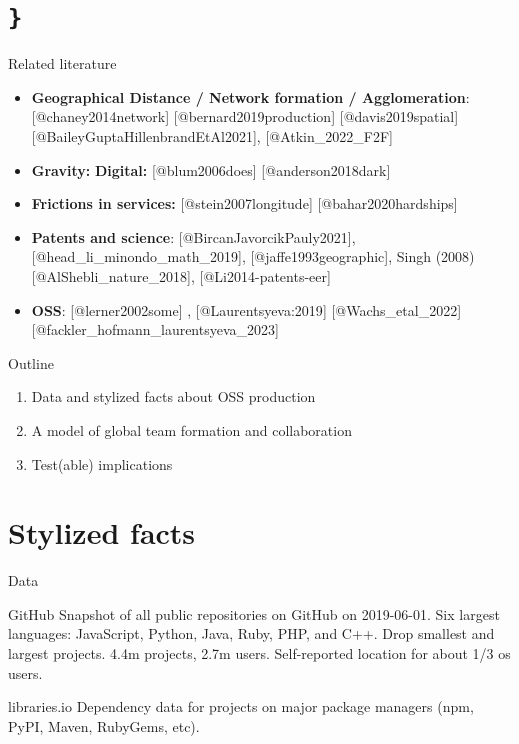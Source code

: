\documentclass[
  ignorenonframetext,
  aspectratio=169,
]{beamer}
\providecommand{\tightlist}{%
  \setlength{\itemsep}{0pt}\setlength{\parskip}{0pt}}
\begin{document}
\section{\texorpdfstring{\texttt{\}}}{\}}}\label{section}

\begin{frame}{Related literature}
\protect\hypertarget{related-literature}{}
\begin{itemize}
\tightlist
\item
  \textbf{Geographical Distance / Network formation / Agglomeration}:
  {[}@chaney2014network{]} {[}@bernard2019production{]}
  {[}@davis2019spatial{]} {[}@BaileyGuptaHillenbrandEtAl2021{]},
  {[}@Atkin\_2022\_F2F{]}
\item
  \textbf{Gravity:} \textbf{Digital:} {[}@blum2006does{]}
  {[}@anderson2018dark{]}
\item
  \textbf{Frictions in services:} {[}@stein2007longitude{]}
  {[}@bahar2020hardships{]}
\item
  \textbf{Patents and science}: {[}@BircanJavorcikPauly2021{]},
  {[}@head\_li\_minondo\_math\_2019{]}, {[}@jaffe1993geographic{]},
  Singh (2008) {[}@AlShebli\_nature\_2018{]}, {[}@Li2014-patents-eer{]}
\item
  \textbf{OSS}: {[}@lerner2002some{]} , {[}@Laurentsyeva:2019{]}
  {[}@Wachs\_etal\_2022{]} {[}@fackler\_hofmann\_laurentsyeva\_2023{]}
\end{itemize}
\end{frame}

\begin{frame}{Outline}
\protect\hypertarget{outline}{}
\begin{enumerate}
\tightlist
\item
  Data and stylized facts about OSS production
\item
  A model of global team formation and collaboration
\item
  Test(able) implications
\end{enumerate}
\end{frame}

\section{Stylized facts}\label{stylized-facts}

\begin{frame}{Data}
\protect\hypertarget{data}{}
\begin{block}{GitHub}
\protect\hypertarget{github}{}
Snapshot of all public repositories on GitHub on 2019-06-01. Six largest
languages: JavaScript, Python, Java, Ruby, PHP, and C++. Drop smallest
and largest projects. 4.4m projects, 2.7m users. Self-reported location
for about 1/3 os users.
\end{block}

\begin{block}{libraries.io}
\protect\hypertarget{libraries.io}{}
Dependency data for projects on major package managers (npm, PyPI,
Maven, RubyGems, etc).
\end{block}
\end{frame}
\end{document}
